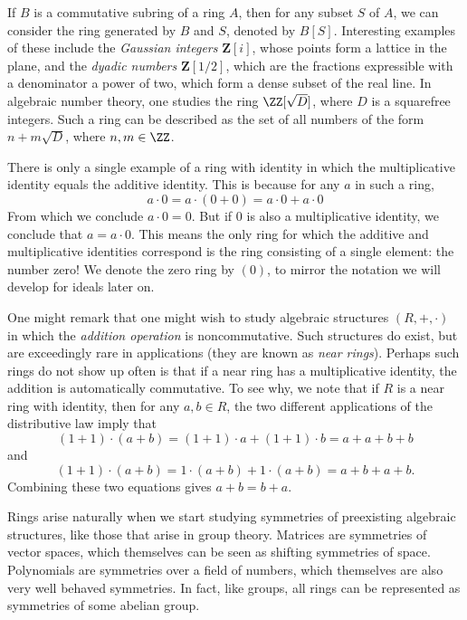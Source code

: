 \begin{example}
    If $B$ is a commutative subring of a ring $A$, then for any subset $S$ of $A$, we can consider the ring generated by $B$ and $S$, denoted by $B[S]$. Interesting examples of these include the \emph{Gaussian integers} $\mathbf{Z}[i]$, whose points form a lattice in the plane, and the \emph{dyadic numbers} $\mathbf{Z}[1/2]$, which are the fractions expressible with a denominator a power of two, which form a dense subset of the real line. In algebraic number theory, one studies the ring $\ZZ[\sqrt{D}]$, where $D$ is a squarefree integers. Such a ring can be described as the set of all numbers of the form $n + m \sqrt{D}$, where $n,m \in \ZZ$.
\end{example}

\begin{remark}
    There is only a single example of a ring with identity in which the multiplicative identity equals the additive identity. This is because for any $a$ in such a ring,
    \[ a \cdot 0 = a \cdot (0 + 0) = a \cdot 0 + a \cdot 0 \]
    From which we conclude $a \cdot 0 = 0$. But if $0$ is also a multiplicative identity, we conclude that $a = a \cdot 0$. This means the only ring for which the additive and multiplicative identities correspond is the ring consisting of a single element: the number zero! We denote the zero ring by $(0)$, to mirror the notation we will develop for ideals later on.
\end{remark}

\begin{remark}
    One might remark that one might wish to study algebraic structures $(R,+,\cdot)$ in which the \emph{addition operation} is noncommutative. Such structures do exist, but are exceedingly rare in applications (they are known as \emph{near rings}). Perhaps such rings do not show up often is that if a near ring has a multiplicative identity, the addition is automatically commutative. To see why, we note that if $R$ is a near ring with identity, then for any $a,b \in R$, the two different applications of the distributive law imply that
    \[ (1 + 1) \cdot (a + b) = (1 + 1) \cdot a + (1 + 1) \cdot b = a + a + b + b \]
    and
    \[ (1 + 1) \cdot (a + b) = 1 \cdot (a + b) + 1 \cdot (a + b) = a + b + a + b. \]
    Combining these two equations gives $a + b = b + a$.
\end{remark}

Rings arise naturally when we start studying symmetries of preexisting algebraic structures, like those that arise in group theory. Matrices are symmetries of vector spaces, which themselves can be seen as shifting symmetries of space. Polynomials are symmetries over a field of numbers, which themselves are also very well behaved symmetries. In fact, like groups, all rings can be represented as symmetries of some abelian group.

